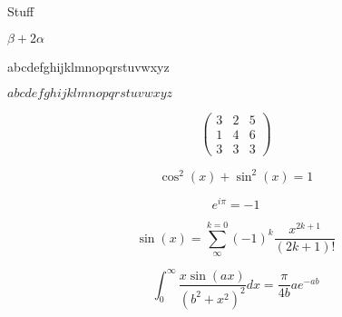 \documentclass[a4paper]{article}
\begin{document}
Stuff

$\beta+2\alpha$

abcdefghijklmnopqrstuvwxyz

$abcdefghijklmnopqrstuvwxyz$

$$ \left(
\begin{array}{ccc}
3&2&5\\
1&4&6\\
3&3&3
\end{array} \right) $$

\begin{equation}
\cos^2(x)+\sin^2(x)=1
\end{equation}

\begin{equation}
e^{i\pi}=-1
\end{equation}

\begin{equation}
\sin(x)=\sum_{\infty}^{k=0}(-1)^k\frac{x^{2k+1}}{(2k+1)!}
\end{equation}

\begin{equation}
\int_{0}^{\infty}\frac{x\sin(ax)}{(b^2+x^2)^2}dx = \frac{\pi}{4b}ae^{-ab}
\end{equation}
\end{document}
